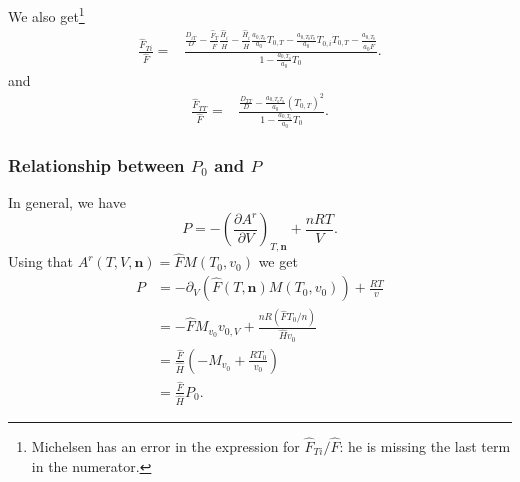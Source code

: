 \documentclass[english]{../thermomemo/thermomemo}
\newcommand{\mbn}[0]{\mathbf n}
\newcommand*{\pdersub}[3]{\left(\frac{\partial #1}{\partial #2}\right)_{#3}}
\newcommand*{\hF}[0]{\hat F}
\newcommand*{\hH}[0]{\hat H}
\newcommand{\lp}{\left(}
\newcommand{\rp}{\right)}
\numberwithin{equation}{section}
\begin{document}
We also get\footnote{Michelsen \cite{Michelsen07} has an error in the
  expression for $\hF_{Ti}/\hF$: he is missing the last term in
  the numerator.}
\begin{equation}
  \begin{aligned}
    \frac{\hF_{Ti}}{\hF} =& \frac{ \frac{D_{iT}}{D} -
      \frac{\hF_{T}}{\hF} \frac{\hH_i}{\hH} -
      \frac{\hH_i}{\hH}\frac{a_{0,T_0}}{a_0} T_{0,T} -
      \frac{a_{0,T_0T_0}}{a_0} T_{0,i} T_{0,T} - \frac{a_{0,T_0}}{a_0 \hF}}{1-\frac{a_{0,T_0}}{a_0} T_0}.
  \end{aligned}
\end{equation}
and
\begin{equation}
  \begin{aligned}
    \frac{\hF_{TT}}{\hF} =& \frac{ \frac{D_{TT}}{D} -
      \frac{a_{0,T_0T_0}}{a_0} (T_{0,T})^2}{1-\frac{a_{0,T_0}}{a_0}
      T_0}.
  \end{aligned}
\end{equation}

\subsubsection*{Relationship between $P_0$ and $P$}
In general, we have
$$
P = -\pdersub{A^r}{V}{T,\mbn} + \frac{nRT}{V}.
$$
Using that $A^r(T,V,\mbn) = \hF M(T_0,v_0)$ we get
\begin{align*}
  P &= -\partial_V \lp \hF(T,\mbn) M(T_0,v_0) \rp + \frac{RT}{v} \\
  &= -\hF M_{v_0} v_{0,V} + \frac{nR(\hF T_0/n)}{\hH v_0} \\
  &= \frac{\hF}{\hH} \lp -M_{v_0} + \frac{RT_0}{v_0} \rp \\
  &= \frac{\hF}{\hH} P_0.
\end{align*}
\end{document}
